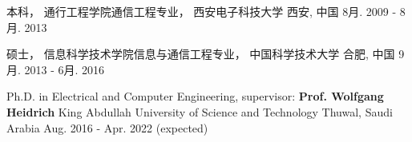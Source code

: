 

%	
%
%
		
\begin{cventries}

  \eduentry
	{本科， 通行工程学院通信工程专业，} %
	{西安电子科技大学} %
	{西安, 中国} %
	{8月. 2009 - 8月. 2013} %
	{}

  \eduentry
	{硕士， 信息科学技术学院信息与通信工程专业，} %
	{中国科学技术大学} %
	{合肥, 中国} %
	{9月. 2013 - 6月. 2016} %
	{}

  \eduentry
	{Ph.D. in Electrical and Computer Engineering, supervisor: \textbf{Prof. Wolfgang Heidrich}} %
	{King Abdullah University of Science and Technology} %
	{Thuwal, Saudi Arabia} %
	{Aug. 2016 - Apr. 2022 (expected)} %
	{}
    


\end{cventries}
